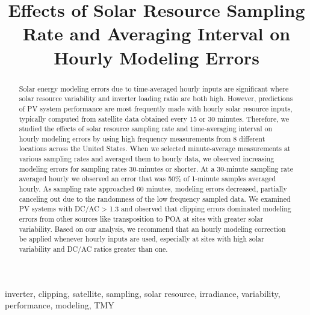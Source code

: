 \documentclass[conference]{IEEEtran}
\begin{document}
\title{Effects of Solar Resource Sampling Rate and Averaging Interval on Hourly Modeling Errors}

\author{
}

\maketitle

\begin{abstract}
Solar energy modeling errors due to time-averaged hourly inputs are significant where solar resource variability and inverter loading ratio are both high. However, predictions of PV system performance are most frequently made with hourly solar resource inputs, typically computed from satellite data obtained every 15 or 30 minutes. Therefore, we studied the effects of solar resource sampling rate and time-averaging interval on hourly modeling errors by using high frequency measurements from 8 different locations across the United States. When we selected minute-average measurements at various sampling rates and averaged them to hourly data, we observed increasing modeling errors for sampling rates 30-minutes or shorter. At a 30-minute sampling rate averaged hourly we observed an error that was 50\% of 1-minute samples averaged hourly. As sampling rate approached 60 minutes, modeling errors decreased, partially canceling out due to the randomness of the low frequency sampled data. We examined PV systems with DC/AC > 1.3 and observed that clipping errors dominated modeling errors from other sources like transposition to POA at sites with greater solar variability. Based on our analysis, we recommend that an hourly modeling correction be applied whenever hourly inputs are used, especially at sites with high solar variability and DC/AC ratios greater than one.
\end{abstract}

\begin{IEEEkeywords}
inverter, clipping, satellite, sampling, solar resource, irradiance, variability, performance, modeling, TMY
\end{IEEEkeywords}
\end{document}
